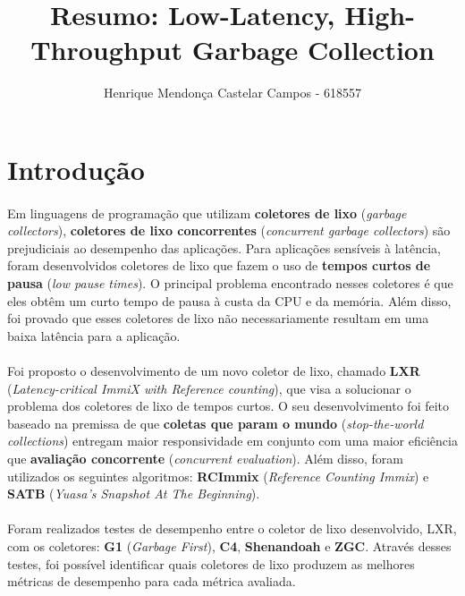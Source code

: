\documentclass[12pt]{article}
\title{Resumo: Low-Latency, High-Throughput Garbage Collection}
\author{Henrique Mendonça Castelar Campos - 618557}
\begin{document}
 

\maketitle

\section{Introdução}

\paragraph{}Em linguagens de programação que utilizam \textbf{coletores de lixo} (\textit{garbage collectors}), \textbf{coletores de lixo concorrentes} (\textit{concurrent garbage collectors}) são prejudiciais ao desempenho das aplicações. Para aplicações sensíveis à latência, foram desenvolvidos coletores de lixo que fazem o uso de \textbf{tempos curtos de pausa} (\textit{low pause times}). O principal problema encontrado nesses coletores é que eles obtêm um curto tempo de pausa à custa da CPU e da memória. Além disso, foi provado que esses coletores de lixo não necessariamente resultam em uma baixa latência para a aplicação.

\paragraph{}Foi proposto o desenvolvimento de um novo coletor de lixo, chamado \textbf{LXR} (\textit{Latency-critical ImmiX with Reference counting}), que visa a solucionar o problema dos coletores de lixo de tempos curtos. O seu desenvolvimento foi feito baseado na premissa de que \textbf{coletas que param o mundo} (\textit{stop-the-world collections}) entregam maior responsividade em conjunto com uma maior eficiência que \textbf{avaliação concorrente} (\textit{concurrent evaluation}). Além disso, foram utilizados os seguintes algoritmos: \textbf{RCImmix} (\textit{Reference Counting Immix}) e \textbf{SATB} (\textit{Yuasa’s Snapshot At The Beginning}).

\paragraph{}Foram realizados testes de desempenho entre o coletor de lixo desenvolvido, LXR, com os coletores: \textbf{G1} (\textit{Garbage First}), \textbf{C4}, \textbf{Shenandoah} e \textbf{ZGC}. Através desses testes, foi possível identificar quais coletores de lixo produzem as melhores métricas de desempenho para cada métrica avaliada.
\end{document}
